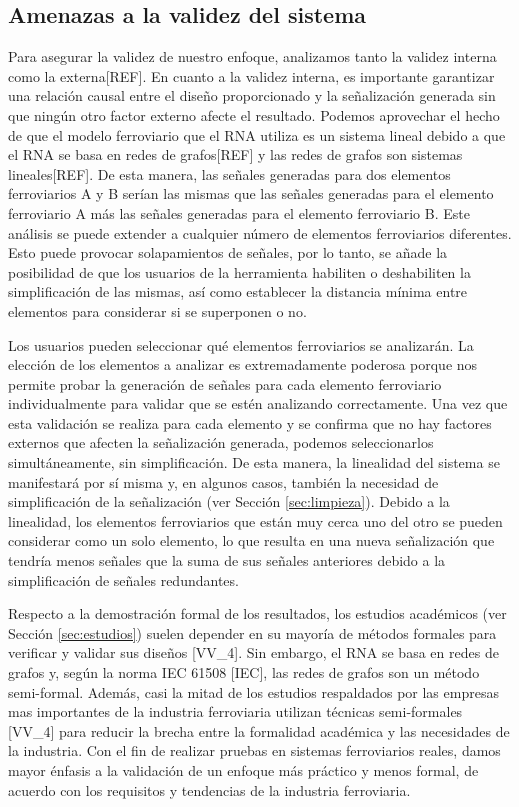 \subsection{Amenazas a la validez del sistema}
    \label{sec:validacion}
    Para asegurar la validez de nuestro enfoque, analizamos tanto la validez interna como la externa[REF]. En cuanto a la validez interna, es importante garantizar una relación causal entre el diseño proporcionado y la señalización generada sin que ningún otro factor externo afecte el resultado. Podemos aprovechar el hecho de que el modelo ferroviario que el RNA utiliza es un sistema lineal debido a que el RNA se basa en redes de grafos[REF] y las redes de grafos son sistemas lineales[REF]. De esta manera, las señales generadas para dos elementos ferroviarios A y B serían las mismas que las señales generadas para el elemento ferroviario A más las señales generadas para el elemento ferroviario B. Este análisis se puede extender a cualquier número de elementos ferroviarios diferentes. Esto puede provocar solapamientos de señales, por lo tanto, se añade la posibilidad de que los usuarios de la herramienta habiliten o deshabiliten la simplificación de las mismas, así como establecer la distancia mínima entre elementos para considerar si se superponen o no.

    Los usuarios pueden seleccionar qué elementos ferroviarios se analizarán. La elección de los elementos a analizar es extremadamente poderosa porque nos permite probar la generación de señales para cada elemento ferroviario individualmente para validar que se estén analizando correctamente. Una vez que esta validación se realiza para cada elemento y se confirma que no hay factores externos que afecten la señalización generada, podemos seleccionarlos simultáneamente, sin simplificación. De esta manera, la linealidad del sistema se manifestará por sí misma y, en algunos casos, también la necesidad de simplificación de la señalización (ver Sección \ref{sec:limpieza}). Debido a la linealidad, los elementos ferroviarios que están muy cerca uno del otro se pueden considerar como un solo elemento, lo que resulta en una nueva señalización que tendría menos señales que la suma de sus señales anteriores debido a la simplificación de señales redundantes.

    Respecto a la demostración formal de los resultados, los estudios académicos (ver Sección \ref{sec:estudios}) suelen depender en su mayoría de métodos formales para verificar y validar sus diseños [VV\_4]. Sin embargo, el RNA se basa en redes de grafos y, según la norma IEC 61508 [IEC], las redes de grafos son un método semi-formal. Además, casi la mitad de los estudios respaldados por las empresas mas importantes de la industria ferroviaria utilizan técnicas semi-formales [VV\_4] para reducir la brecha entre la formalidad académica y las necesidades de la industria. Con el fin de realizar pruebas en sistemas ferroviarios reales, damos mayor énfasis a la validación de un enfoque más práctico y menos formal, de acuerdo con los requisitos y tendencias de la industria ferroviaria.
    
